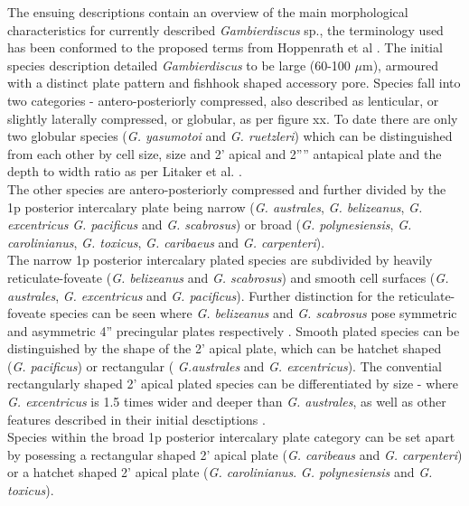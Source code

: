 \documentclass[12pt]{article}
\begin{document}
The ensuing descriptions contain an overview of the main morphological characteristics for currently described \emph{Gambierdiscus} sp., the terminology used has been conformed to the proposed terms from Hoppenrath et al \cite{hoppenrath2013taxonomy}. The initial species description detailed \emph{Gambierdiscus} to be large (60-100 $\mu$m), armoured with a distinct plate pattern and fishhook shaped accessory pore. Species fall into two categories - antero-posteriorly compressed, also described as lenticular, or slightly laterally compressed, or globular, as per figure xx. %
 To date there are only two globular species (\emph{G. yasumotoi} and \emph{G. ruetzleri}) which can be distinguished from each other by cell size, size and 2' apical and 2'''' antapical plate and the depth to width ratio as per Litaker et al. \cite{litaker2009taxonomy}. \\
The other species are antero-posteriorly compressed and further divided by the 1p posterior intercalary plate being narrow (\emph{G. australes}, \emph{G. belizeanus}, \emph{G. excentricus} \emph{G. pacificus} and \emph{G. scabrosus}) or broad (\emph{G. polynesiensis}, \emph{G. carolinianus}, \emph{G. toxicus}, \emph{G. caribaeus} and \emph{G. carpenteri}). \\
The narrow 1p posterior intercalary plated species are subdivided by heavily reticulate-foveate (\emph{G. belizeanus} and \emph{G. scabrosus}) and smooth cell surfaces (\emph{G. australes}, \emph{G. excentricus} and \emph{G. pacificus}). Further distinction for the reticulate-foveate species can be seen where \emph{G. belizeanus} and \emph{G. scabrosus} pose symmetric and asymmetric 4'' precingular plates respectively \cite{nishimura2014morphology}. %
Smooth plated species can be distinguished by the shape of the 2' apical plate, which can be hatchet shaped (\emph{G. pacificus}) or rectangular ( \emph{G.australes} and \emph{G. excentricus}). The convential rectangularly shaped 2' apical plated species can be differentiated by size - where \emph{G. excentricus} is 1.5 times wider and deeper than \emph{G. australes}, as well as other features described in their initial desctiptions \cite{chinain1999morphology,fraga2011gambierdiscus}. \\
Species within the broad 1p posterior intercalary plate category can be set apart by posessing a rectangular shaped 2' apical plate (\emph{G. caribeaus} and \emph{G. carpenteri}) or a hatchet shaped 2' apical plate (\emph{G. carolinianus}. \emph{G. polynesiensis} and \emph{G. toxicus}).
\end{document}
